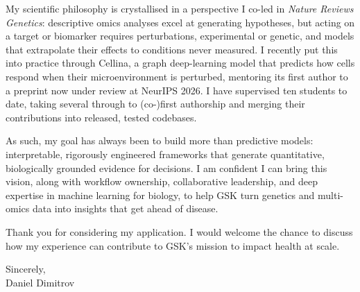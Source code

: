 \documentclass[11pt,a4paper]{article}
\begin{document}
My scientific philosophy is crystallised in a perspective I co-led in \textit{Nature Reviews Genetics}: descriptive omics analyses excel at generating hypotheses, but acting on a target or biomarker requires perturbations, experimental or genetic, and models that extrapolate their effects to conditions never measured. I recently put this into practice through Cellina, a graph deep-learning model that predicts how cells respond when their microenvironment is perturbed, mentoring its first author to a preprint now under review at NeurIPS 2026. I have supervised ten students to date, taking several through to (co-)first authorship and merging their contributions into released, tested codebases.

As such, my goal has always been to build more than predictive models: interpretable, rigorously engineered frameworks that generate quantitative, biologically grounded evidence for decisions. I am confident I can bring this vision, along with workflow ownership, collaborative leadership, and deep expertise in machine learning for biology, to help GSK turn genetics and multi-omics data into insights that get ahead of disease.

Thank you for considering my application. I would welcome the chance to discuss how my experience can contribute to GSK's mission to impact health at scale.

Sincerely,\\
Daniel Dimitrov
\end{document}
